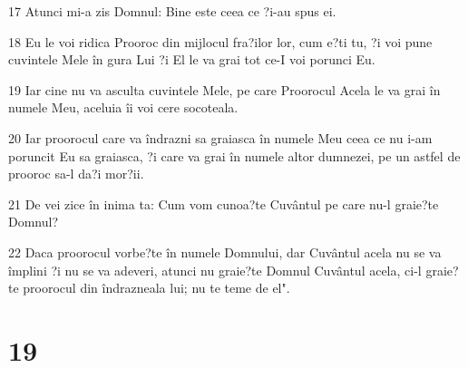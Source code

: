 \par 17 Atunci mi-a zis Domnul: Bine este ceea ce ?i-au spus ei.
\par 18 Eu le voi ridica Prooroc din mijlocul fra?ilor lor, cum e?ti tu, ?i voi pune cuvintele Mele în gura Lui ?i El le va grai tot ce-I voi porunci Eu.
\par 19 Iar cine nu va asculta cuvintele Mele, pe care Proorocul Acela le va grai în numele Meu, aceluia îi voi cere socoteala.
\par 20 Iar proorocul care va îndrazni sa graiasca în numele Meu ceea ce nu i-am poruncit Eu sa graiasca, ?i care va grai în numele altor dumnezei, pe un astfel de prooroc sa-l da?i mor?ii.
\par 21 De vei zice în inima ta: Cum vom cunoa?te Cuvântul pe care nu-l graie?te Domnul?
\par 22 Daca proorocul vorbe?te în numele Domnului, dar Cuvântul acela nu se va împlini ?i nu se va adeveri, atunci nu graie?te Domnul Cuvântul acela, ci-l graie?te proorocul din îndrazneala lui; nu te teme de el".

\chapter{19}

